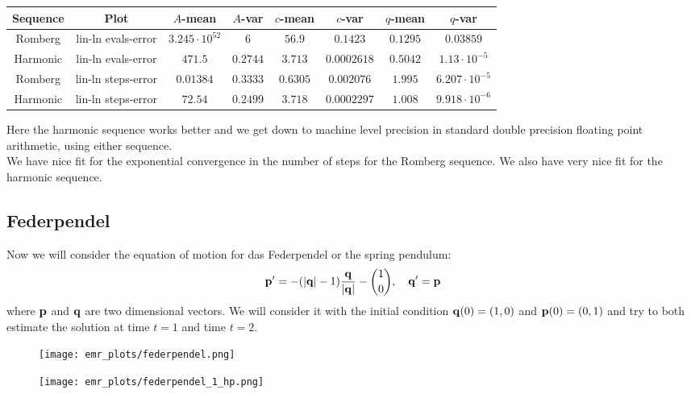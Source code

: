 \begin{table}[H]
    \centering
    \small
     \begin{tabular}{c|c||c|c|c|c|c|c}
Sequence & Plot & \(A\)-mean & \(A\)-var & \(c\)-mean & \(c\)-var & \(q\)-mean & \(q\)-var\\\hline
Romberg & lin-ln evals-error & \(3.245\cdot 10^{52}\) & \(6\) & \(56.9\) & \(0.1423\) & \(0.1295\) & \(0.03859\) \\
Harmonic & lin-ln evals-error & \(471.5\) & \(0.2744\) & \(3.713\) & \(0.0002618\) & \(0.5042\) & \(1.13\cdot 10^{-5}\) \\
Romberg & lin-ln steps-error & \(0.01384\) & \(0.3333\) & \(0.6305\) & \(0.002076\) & \(1.995\) & \(6.207\cdot 10^{-5}\) \\
Harmonic & lin-ln steps-error & \(72.54\) & \(0.2499\) & \(3.718\) & \(0.0002297\) & \(1.008\) & \(9.918\cdot 10^{-6}\) \\
    \end{tabular}
    \label{tab:my_label}
\end{table}

Here the harmonic sequence works better and we get down to machine level precision in standard double precision floating point arithmetic, using either sequence.\\

We have nice fit for the exponential convergence in the number of steps for the Romberg sequence. We also have very nice fit for the harmonic sequence.

\subsection{Federpendel}

Now we will consider the equation of motion for das Federpendel or the spring pendulum:
\[
\mathbf{p}' = -(|\mathbf{q}| - 1)\frac{\mathbf{q}}{|\mathbf{q}|} - {1\choose 0}, \quad \mathbf{q}' = \mathbf{p}
\]
where \(\mathbf{p}\) and \(\mathbf{q}\) are two dimensional vectors. We will consider it with the initial condition \(\mathbf{q}(0) = (1,0)\) and \(\mathbf{p}(0) = (0,1)\) and try to both estimate the solution at time \(t = 1\) and time \(t = 2\).

\begin{figure}[H]
\centering
\begin{minipage}{0.45\textwidth}
\centering
\texttt{[image: emr\_plots/federpendel.png]}
\end{minipage}
\begin{minipage}{0.45\textwidth}
\centering
\texttt{[image: emr\_plots/federpendel\_1\_hp.png]}
\end{minipage}
\end{figure}

